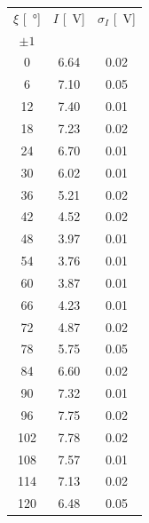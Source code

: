 \documentclass[10pt,oneside,a4paper]{article}
\begin{document}
\begin{minipage}[t]{0.3\linewidth}
\begin{center}
\label{tab:taratura_lambda4}
\begin{tabular}{c|c|c}
\toprule
     $\xi$ [\SI{}{\degree}] &    $I$ [\SI{}{V}] &   $\sigma_I$ [\SI{}{V}]\\
     $\pm 1$ & & \\
\midrule
   0 &  6.64 &  0.02 \\
   6 &  7.10 &  0.05 \\
  12 &  7.40 &  0.01 \\
  18 &  7.23 &  0.02 \\
  24 &  6.70 &  0.01 \\
  30 &  6.02 &  0.01 \\
  36 &  5.21 &  0.02 \\
  42 &  4.52 &  0.02 \\
  48 &  3.97 &  0.01 \\
  54 &  3.76 &  0.01 \\
  60 &  3.87 &  0.01 \\
  66 &  4.23 &  0.01 \\
  72 &  4.87 &  0.02 \\
  78 &  5.75 &  0.05 \\
  84 &  6.60 &  0.02 \\
  90 &  7.32 &  0.01 \\
  96 &  7.75 &  0.02 \\
 102 &  7.78 &  0.02 \\
 108 &  7.57 &  0.01 \\
 114 &  7.13 &  0.02 \\
 120 &  6.48 &  0.05 \\
\bottomrule
\end{tabular}
\end{center}
\end{minipage}
\hspace{1em}
\end{document}
